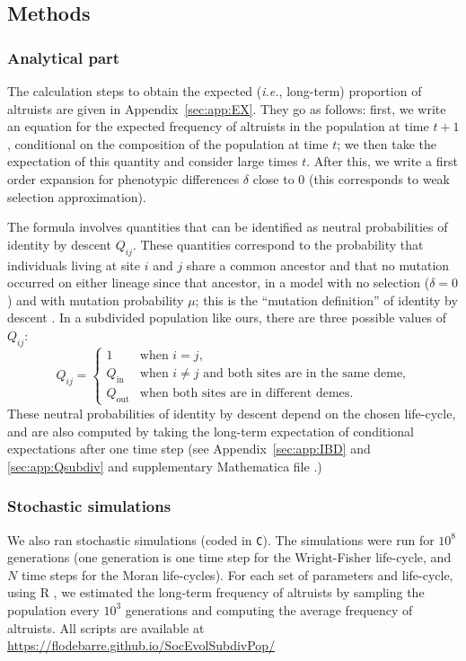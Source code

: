 \documentclass[11pt, letterpaper]{article}
\newcommand{\ie}{\textit{i.e.}}
\newcommand{\appname}[0]{Appendix}
\newcommand{\inn}{\textrm{in}}
\newcommand{\out}{\textrm{out}}
\newcommand{\Qin}{Q_{\inn}}
\newcommand{\Qout}{Q_{\out}}
\newcommand{\selstr}{\delta}
\begin{document}
\subsection*{Methods}
\subsubsection*{Analytical part}

The calculation steps to obtain the expected (\ie, long-term) proportion of altruists are given in \appname~\ref{sec:app:EX}. They go as follows: first, we write an equation for the expected frequency of altruists in the population at time $t+1$, conditional on the composition of the population at time $t$; we then take the expectation of this quantity and consider large times $t$. After this, we write a first order expansion for phenotypic differences $\selstr$ close to $0$ (this corresponds to weak selection approximation). 

The formula involves quantities that can be identified as neutral probabilities of identity by descent $Q_{ij}$. These quantities correspond to the probability that individuals living at site $i$  and $j$ share a common ancestor and that no mutation occurred on either lineage since that ancestor, in a model with no selection ($\selstr=0$) and with mutation probability $\mu$; this is the ``mutation definition'' of identity by descent \citep{RoussetBilliard2000}. 
In a subdivided population like ours, there are three possible values of $Q_{ij}$:
%
\begin{equation}\label{eq:Q3}
Q_{ij} = \begin{cases} 1 & \textrm{when $i=j$,} \\
\Qin & \textrm{when $i\neq j$ and both sites are in the same deme,}\\
\Qout & \textrm{when both sites are in different demes.}
\end{cases}
\end{equation}
%
These neutral probabilities of identity by descent depend on the chosen life-cycle, and are also computed by taking the long-term expectation of conditional expectations after one time step (see \appname~\ref{sec:app:IBD} and \ref{sec:app:Qsubdiv} and supplementary Mathematica file \citep{Mathematica11}.) 

\subsubsection*{Stochastic simulations}
We also ran stochastic simulations (coded in \texttt{C}). The simulations were run for $10^8$ generations (one generation is one time step for the Wright-Fisher life-cycle, and $N$ time steps for the Moran life-cycles). For each set of parameters and life-cycle, using R \citep{R2015}, we estimated the long-term frequency of altruists by sampling the population every $10^3$ generations and computing the average frequency of altruists. 
%
All scripts are available at \\
{\small \url{https://flodebarre.github.io/SocEvolSubdivPop/}} 
\end{document}
